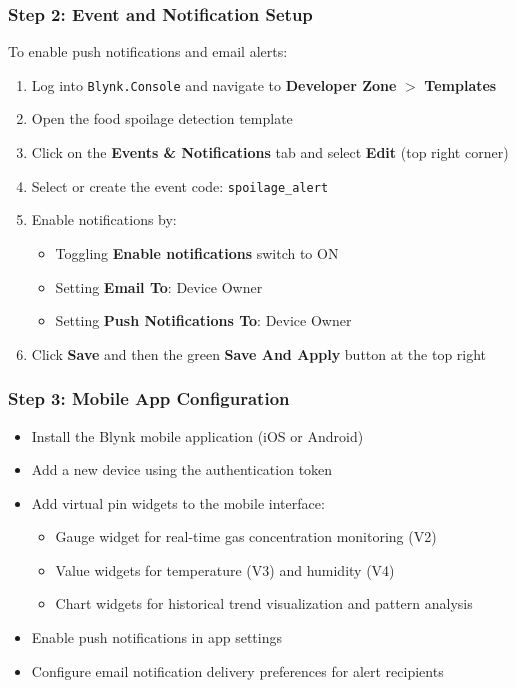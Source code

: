\subsubsection{Step 2: Event and Notification Setup}
To enable push notifications and email alerts:
\begin{enumerate}
    \item Log into \texttt{Blynk.Console} and navigate to \textbf{Developer Zone} $>$ \textbf{Templates}
    \item Open the food spoilage detection template
    \item Click on the \textbf{Events \& Notifications} tab and select \textbf{Edit} (top right corner)
    \item Select or create the event code: \texttt{spoilage\_alert}
    \item Enable notifications by:
    \begin{itemize}
        \item Toggling \textbf{Enable notifications} switch to ON
        \item Setting \textbf{Email To}: Device Owner
        \item Setting \textbf{Push Notifications To}: Device Owner
    \end{itemize}
    \item Click \textbf{Save} and then the green \textbf{Save And Apply} button at the top right
\end{enumerate}

\subsubsection{Step 3: Mobile App Configuration}
\begin{itemize}
    \item Install the Blynk mobile application (iOS or Android)
    \item Add a new device using the authentication token
    \item Add virtual pin widgets to the mobile interface:
    \begin{itemize}
        \item Gauge widget for real-time gas concentration monitoring (V2)
        \item Value widgets for temperature (V3) and humidity (V4)
        \item Chart widgets for historical trend visualization and pattern analysis
    \end{itemize}
    \item Enable push notifications in app settings
    \item Configure email notification delivery preferences for alert recipients
\end{itemize}

